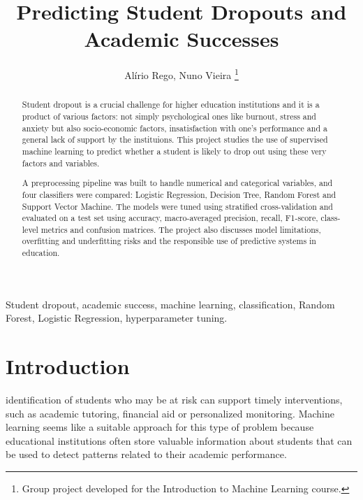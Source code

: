 \documentclass[lettersize,journal]{IEEEtran}
\begin{document}
\title{Predicting Student Dropouts and Academic Successes}

\author{Alírio Rego, Nuno Vieira%
\thanks{Group project developed for the Introduction to Machine Learning course.}}


\maketitle

\begin{abstract}
Student dropout is a crucial challenge for higher education institutions and it is a product of various factors: not simply psychological ones like burnout, stress and anxiety but also socio-economic factors, insatisfaction with one's performance and a general lack of support by the instituions.
This project studies the use of supervised machine learning to predict whether a student is likely to drop out using these very factors and variables.

A preprocessing pipeline was built to handle numerical and categorical variables, and four classifiers were compared: Logistic Regression, Decision Tree, 
Random Forest and Support Vector Machine. The models were tuned using stratified cross-validation and evaluated on a test set using accuracy, 
macro-averaged precision, recall, F1-score, class-level metrics and confusion matrices. The project also discusses model limitations, overfitting and 
underfitting risks and the responsible use of predictive systems in education.
\end{abstract}

\begin{IEEEkeywords}
Student dropout, academic success, machine learning, classification, Random Forest, Logistic Regression, hyperparameter tuning.
\end{IEEEkeywords}

\section{Introduction}
 identification of students who may be at risk can support timely interventions, such as academic tutoring, 
financial aid or personalized monitoring. Machine learning seems like a suitable approach for this type of problem because educational institutions 
often store valuable information about students that can be used to detect patterns related to their academic performance.
\end{document}
